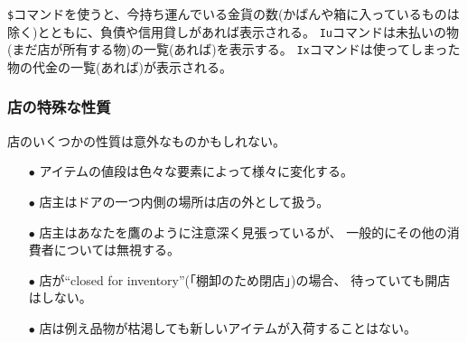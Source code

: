 {\tt \$}コマンドを使うと、今持ち運んでいる金貨の数(かばんや箱に入っているものは
除く)とともに、負債や信用貸しがあれば表示される。
{\tt Iu}コマンドは未払いの物(まだ店が所有する物)の一覧(あれば)を表示する。
{\tt Ix}コマンドは使ってしまった物の代金の一覧(あれば)が表示される。

\subsubsection*{店の特殊な性質}

店のいくつかの性質は意外なものかもしれない。

\begin{itemize}
\item[$\bullet$]
アイテムの値段は色々な要素によって様々に変化する。
\item[$\bullet$]
店主はドアの一つ内側の場所は店の外として扱う。
\item[$\bullet$]
店主はあなたを鷹のように注意深く見張っているが、
一般的にその他の消費者については無視する。
\item[$\bullet$]
店が``closed for inventory''(「棚卸のため閉店」)の場合、
待っていても開店はしない。
\item[$\bullet$]
店は例え品物が枯渇しても新しいアイテムが入荷することはない。
\end{itemize}


